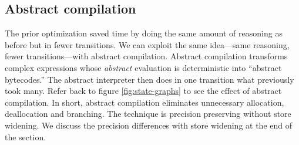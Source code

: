 \documentclass[9pt]{sigplanconf} %
\begin{document}

\subsection{Abstract compilation}

The prior optimization saved time by doing the same amount of reasoning as before but in fewer transitions.
%
 We can exploit the same idea---same reasoning, fewer transitions---with abstract compilation.
%
 Abstract compilation transforms complex expressions whose \emph{abstract} evaluation is deterministic into ``abstract bytecodes.''
%
  The abstract interpreter then does in one transition what previously took many.
%
  Refer back to figure \ref{fig:state-graphs} to see the effect of abstract compilation.
%
 In short, abstract compilation eliminates unnecessary allocation, deallocation and branching.
%
 The technique is precision preserving without store widening.
%
 We discuss the precision differences with store widening at the end of the section.


\end{document}
